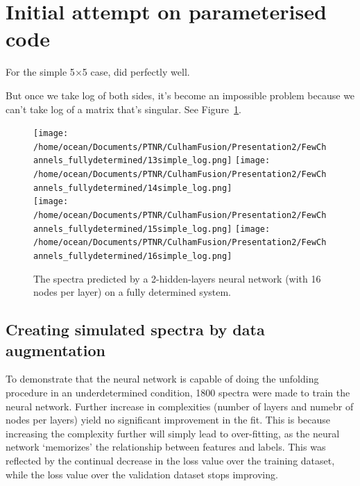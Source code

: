 \documentclass[a4paper, 12pt]{article}
\begin{document}
\section{Initial attempt on parameterised code}
For the simple 5$\times$5 case, did perfectly well.

But once we take log of both sides, it's become an impossible problem because we can't take log of a matrix that's singular. See Figure~\ref{5x5}.

\begin{figure}
\centering
\texttt{[image: /home/ocean/Documents/PTNR/CulhamFusion/Presentation2/FewChannels\_fullydetermined/13simple\_log.png]}
\texttt{[image: /home/ocean/Documents/PTNR/CulhamFusion/Presentation2/FewChannels\_fullydetermined/14simple\_log.png]}\\
\texttt{[image: /home/ocean/Documents/PTNR/CulhamFusion/Presentation2/FewChannels\_fullydetermined/15simple\_log.png]}
\texttt{[image: /home/ocean/Documents/PTNR/CulhamFusion/Presentation2/FewChannels\_fullydetermined/16simple\_log.png]}
\caption{The spectra predicted by a 2-hidden-layers neural network (with 16 nodes per layer) on a fully determined system.} \label{5x5}
\end{figure}

\subsection{Creating simulated spectra by data augmentation}
To demonstrate that the neural network is capable of doing the unfolding procedure in an underdetermined condition, 1800 spectra were made to train the neural network.
Further increase in complexities (number of layers and numebr of nodes per layers) yield no significant improvement in the fit. This is because increasing the complexity further will simply lead to over-fitting, as the neural network `memorizes' the relationship between features and labels. This was reflected by the continual decrease in the loss value over the training dataset, while the loss value over the validation dataset stops improving.
\end{document}
